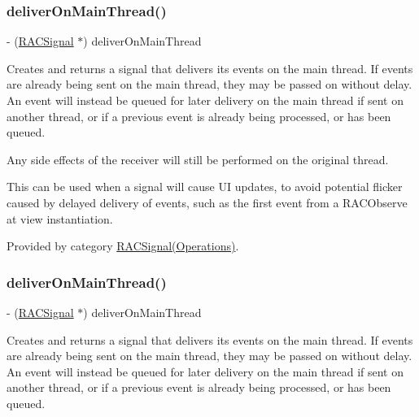 \subsubsection{\texorpdfstring{deliver\+On\+Main\+Thread()}{deliverOnMainThread()}\hspace{0.1cm}{\footnotesize\ttfamily [2/3]}}
{\footnotesize\ttfamily -\/ (\mbox{\hyperlink{interface_r_a_c_signal}{R\+A\+C\+Signal}} $\ast$) deliver\+On\+Main\+Thread \begin{DoxyParamCaption}{ }\end{DoxyParamCaption}}

Creates and returns a signal that delivers its events on the main thread. If events are already being sent on the main thread, they may be passed on without delay. An event will instead be queued for later delivery on the main thread if sent on another thread, or if a previous event is already being processed, or has been queued.

Any side effects of the receiver will still be performed on the original thread.

This can be used when a signal will cause UI updates, to avoid potential flicker caused by delayed delivery of events, such as the first event from a R\+A\+C\+Observe at view instantiation. 

Provided by category \mbox{\hyperlink{category_r_a_c_signal_07_operations_08_a0c7042ce0eb6c729bc38421295296db1}{R\+A\+C\+Signal(\+Operations)}}.

\mbox{\label{interface_r_a_c_signal_a0c7042ce0eb6c729bc38421295296db1}} 
\subsubsection{\texorpdfstring{deliver\+On\+Main\+Thread()}{deliverOnMainThread()}\hspace{0.1cm}{\footnotesize\ttfamily [3/3]}}
{\footnotesize\ttfamily -\/ (\mbox{\hyperlink{interface_r_a_c_signal}{R\+A\+C\+Signal}} $\ast$) deliver\+On\+Main\+Thread \begin{DoxyParamCaption}{ }\end{DoxyParamCaption}}

Creates and returns a signal that delivers its events on the main thread. If events are already being sent on the main thread, they may be passed on without delay. An event will instead be queued for later delivery on the main thread if sent on another thread, or if a previous event is already being processed, or has been queued.


